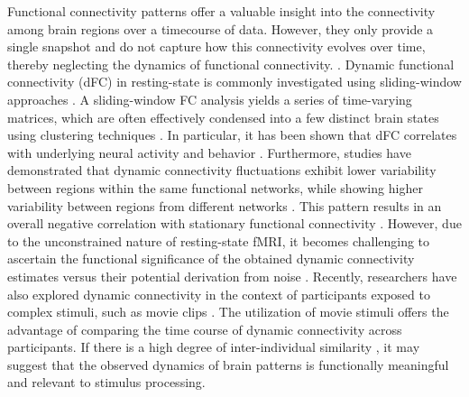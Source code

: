 Functional connectivity patterns offer a valuable insight into the connectivity
among brain regions over a timecourse of data. However, they only provide a
single snapshot and do not capture how this connectivity evolves over time,
thereby neglecting the dynamics of functional connectivity.
\citep{Allen2012TrackingWholeBrain,Di2020Intersubjectconsistentdynamic,Hutchison2013Dynamicfunctionalconnectivity}.
Dynamic functional connectivity (dFC) in resting-state is commonly investigated
using sliding-window approaches
\citep{Allen2012TrackingWholeBrain,Hutchison2013Dynamicfunctionalconnectivity,Preti2017dynamicfunctionalconnectome,Lurie2020Questionscontroversiesstudy}.
A sliding-window FC analysis yields a series of time-varying matrices, which are
often effectively condensed into a few distinct brain states using clustering
techniques \citep{Hutchison2013Dynamicfunctionalconnectivity}. In particular, it
has been shown that dFC correlates with underlying neural activity
\citep{Tagliazucchi2012Criticalitylargescale,Thompson2013Neuralcorrelatestime,Keilholz2014NeuralBasisTime}
and behavior \citep{Liegeois2019Restingbraindynamics}. Furthermore, studies have
demonstrated that dynamic connectivity fluctuations exhibit lower variability
between regions within the same functional networks, while showing higher
variability between regions from different networks
\citep{Fu2017AssociationsFunctionalConnectivity}. This pattern results in an
overall negative correlation with stationary functional connectivity
\citep{Thompson2015meanvariancerelationshipreveals,Zhang2018Testretestreliability}.
However, due to the unconstrained nature of resting-state fMRI, it becomes
challenging to ascertain the functional significance of the obtained dynamic
connectivity estimates versus their potential derivation from noise
\citep{Lindquist2014Evaluatingdynamicbivariate}. Recently, researchers have also
explored dynamic connectivity in the context of participants exposed to complex
stimuli, such as movie clips \citep{Di2020Intersubjectconsistentdynamic}. The
utilization of movie stimuli offers the advantage of comparing the time course
of dynamic connectivity across participants. If there is a high degree of
inter-individual similarity
\citep{Hasson2004IntersubjectSynchronizationCortical,Nastase2019Measuringsharedresponses},
it may suggest that the observed dynamics of brain patterns is functionally
meaningful and relevant to stimulus processing.


